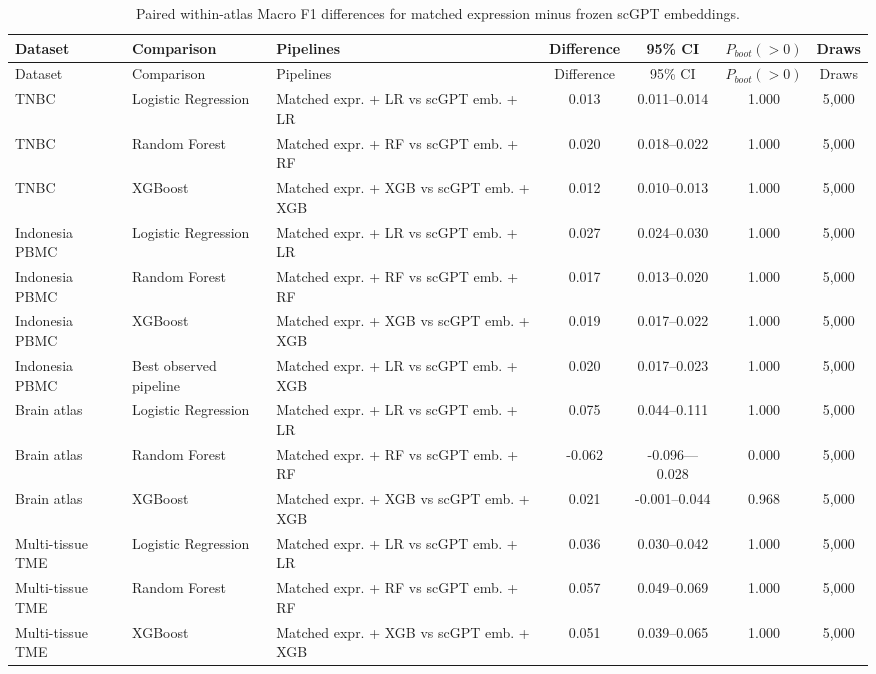 \begin{landscape}\scriptsize\setlength{\tabcolsep}{4pt}
\begin{longtable}{lllcccc}
\caption{Paired within-atlas Macro F1 differences for matched expression minus frozen scGPT embeddings.}\label{tab:s2}\\
\toprule Dataset & Comparison & Pipelines & Difference & 95\% CI & $P_{boot}(>0)$ & Draws \\
\midrule\endfirsthead\toprule Dataset & Comparison & Pipelines & Difference & 95\% CI & $P_{boot}(>0)$ & Draws \\
\midrule\endhead\bottomrule\endlastfoot
TNBC & Logistic Regression & Matched expr. + LR vs scGPT emb. + LR & 0.013 & 0.011--0.014 & 1.000 & 5,000 \\
TNBC & Random Forest & Matched expr. + RF vs scGPT emb. + RF & 0.020 & 0.018--0.022 & 1.000 & 5,000 \\
TNBC & XGBoost & Matched expr. + XGB vs scGPT emb. + XGB & 0.012 & 0.010--0.013 & 1.000 & 5,000 \\
Indonesia PBMC & Logistic Regression & Matched expr. + LR vs scGPT emb. + LR & 0.027 & 0.024--0.030 & 1.000 & 5,000 \\
Indonesia PBMC & Random Forest & Matched expr. + RF vs scGPT emb. + RF & 0.017 & 0.013--0.020 & 1.000 & 5,000 \\
Indonesia PBMC & XGBoost & Matched expr. + XGB vs scGPT emb. + XGB & 0.019 & 0.017--0.022 & 1.000 & 5,000 \\
Indonesia PBMC & Best observed pipeline & Matched expr. + LR vs scGPT emb. + XGB & 0.020 & 0.017--0.023 & 1.000 & 5,000 \\
Brain atlas & Logistic Regression & Matched expr. + LR vs scGPT emb. + LR & 0.075 & 0.044--0.111 & 1.000 & 5,000 \\
Brain atlas & Random Forest & Matched expr. + RF vs scGPT emb. + RF & -0.062 & -0.096---0.028 & 0.000 & 5,000 \\
Brain atlas & XGBoost & Matched expr. + XGB vs scGPT emb. + XGB & 0.021 & -0.001--0.044 & 0.968 & 5,000 \\
Multi-tissue TME & Logistic Regression & Matched expr. + LR vs scGPT emb. + LR & 0.036 & 0.030--0.042 & 1.000 & 5,000 \\
Multi-tissue TME & Random Forest & Matched expr. + RF vs scGPT emb. + RF & 0.057 & 0.049--0.069 & 1.000 & 5,000 \\
Multi-tissue TME & XGBoost & Matched expr. + XGB vs scGPT emb. + XGB & 0.051 & 0.039--0.065 & 1.000 & 5,000 \\

\end{longtable}
\end{landscape}
